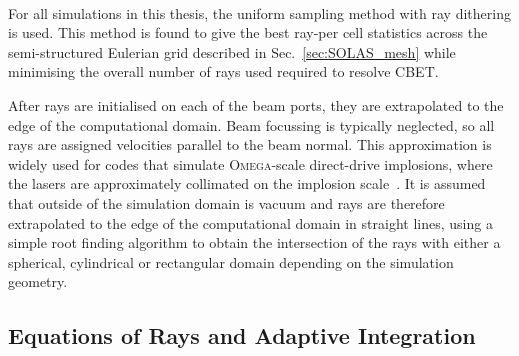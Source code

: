 \paragraph*{}
For all simulations in this thesis, the uniform sampling method with ray dithering is used.
This method is found to give the best ray-per cell statistics across the semi-structured Eulerian grid described in Sec.~\ref{sec:SOLAS_mesh} while minimising the overall number of rays used required to resolve \ac{CBET}.

After rays are initialised on each of the beam ports, they are extrapolated to the edge of the computational domain.
Beam focussing is typically neglected, so all rays are assigned velocities parallel to the beam normal.
This approximation is widely used for codes that simulate \textsc{Omega}-scale direct-drive implosions, where the lasers are approximately collimated on the implosion scale~\cite{colaitis_inverse_2021,marozas_wavelength-detuning_2018}.
It is assumed that outside of the simulation domain is vacuum and rays are therefore extrapolated to the edge of the computational domain in straight lines, using a simple root finding algorithm to obtain the intersection of the rays with either a spherical, cylindrical or rectangular domain depending on the simulation geometry.

\subsection{Equations of Rays and Adaptive Integration}%
\label{sec:SOLAS_ray_propagation}

